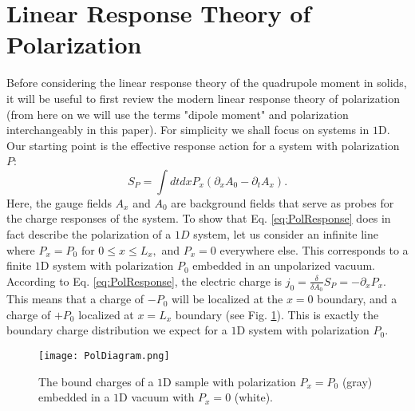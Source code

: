 \documentclass[prb,aps,twocolumn,groupaddress,floatfix]{revtex4-1}
\begin{document}
\section{Linear Response Theory of Polarization}\label{sec:PolReview}
Before considering the linear response theory of the quadrupole moment in solids, it will be useful to first review the modern linear response theory of polarization\cite{resta2007} (from here on we will use the terms "dipole moment" and polarization interchangeably in this paper). For simplicity we shall focus on systems in $1$D. Our starting point is the effective response action for a system with polarization $P$:
\begin{equation}
S_{P} = \int dt dx P_x (\partial_x A_0 - \partial_t A_x).\label{eq:PolResponse}
\end{equation}
Here, the gauge fields $A_x$ and $A_0$ are background fields that serve as probes for the charge responses of the system. To show that Eq. \ref{eq:PolResponse} does in fact describe the polarization of a $1D$ system, let us consider an infinite line where $P_x = P_0$ for $0\leq x \leq L_x,$ and $P_x = 0$ everywhere else. This corresponds to a finite $1$D system with polarization $P_0$ embedded in an unpolarized vacuum. According to Eq. \ref{eq:PolResponse}, the electric charge is $j_0 = \frac{\delta}{\delta A_0} S_{P} = -\partial_x P_x$.  This means that a charge of $-P_0$ will be localized at the $x=0$ boundary, and a charge of $+P_0$ localized at $x = L_x$ boundary (see Fig. \ref{fig:PolDiagram}). This is exactly the boundary charge distribution we expect for a $1$D system with polarization $P_0$. 

\begin{figure}
\texttt{[image: PolDiagram.png]}
\caption{The bound charges of a $1$D sample with polarization $P_{x} = P_0$ (gray) embedded in a $1$D vacuum with $P_{x} = 0$ (white).}\label{fig:PolDiagram}
\end{figure}
\end{document}
